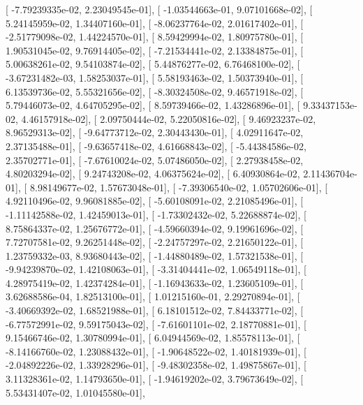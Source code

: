 \documentclass{article}
\begin{document}
       [ -7.79239335e-02,   2.23049545e-01],
       [ -1.03544663e-01,   9.07101668e-02],
       [  5.24145959e-02,   1.34407160e-01],
       [ -8.06237764e-02,   2.01617402e-01],
       [ -2.51779098e-02,   1.44224570e-01],
       [  8.59429994e-02,   1.80975780e-01],
       [  1.90531045e-02,   9.76914405e-02],
       [ -7.21534441e-02,   2.13384875e-01],
       [  5.00638261e-02,   9.54103874e-02],
       [  5.44876277e-02,   6.76468100e-02],
       [ -3.67231482e-03,   1.58253037e-01],
       [  5.58193463e-02,   1.50373940e-01],
       [  6.13539736e-02,   5.55321656e-02],
       [ -8.30324508e-02,   9.46571918e-02],
       [  5.79446073e-02,   4.64705295e-02],
       [  8.59739466e-02,   1.43286896e-01],
       [  9.33437153e-02,   4.46157918e-02],
       [  2.09750444e-02,   5.22050816e-02],
       [  9.46923237e-02,   8.96529313e-02],
       [ -9.64773712e-02,   2.30443430e-01],
       [  4.02911647e-02,   2.37135488e-01],
       [ -9.63657418e-02,   4.61668843e-02],
       [ -5.44384586e-02,   2.35702771e-01],
       [ -7.67610024e-02,   5.07486050e-02],
       [  2.27938458e-02,   4.80203294e-02],
       [  9.24743208e-02,   4.06375624e-02],
       [  6.40930864e-02,   2.11436704e-01],
       [  8.98149677e-02,   1.57673048e-01],
       [ -7.39306540e-02,   1.05702606e-01],
       [  4.92110496e-02,   9.96081885e-02],
       [ -5.60108091e-02,   2.21085496e-01],
       [ -1.11142588e-02,   1.42459013e-01],
       [ -1.73302432e-02,   5.22688874e-02],
       [  8.75864337e-02,   1.25676772e-01],
       [ -4.59660394e-02,   9.19961696e-02],
       [  7.72707581e-02,   9.26251448e-02],
       [ -2.24757297e-02,   2.21650122e-01],
       [  1.23759332e-03,   8.93680443e-02],
       [ -1.44880489e-02,   1.57321538e-01],
       [ -9.94239870e-02,   1.42108063e-01],
       [ -3.31404441e-02,   1.06549118e-01],
       [  4.28975419e-02,   1.42374284e-01],
       [ -1.16943633e-02,   1.23605109e-01],
       [  3.62688586e-04,   1.82513100e-01],
       [  1.01215160e-01,   2.29270894e-01],
       [ -3.40669392e-02,   1.68521988e-01],
       [  6.18101512e-02,   7.84433771e-02],
       [ -6.77572991e-02,   9.59175043e-02],
       [ -7.61601101e-02,   2.18770881e-01],
       [  9.15466746e-02,   1.30780994e-01],
       [  6.04944569e-02,   1.85578113e-01],
       [ -8.14166760e-02,   1.23088432e-01],
       [ -1.90648522e-02,   1.40181939e-01],
       [ -2.04892226e-02,   1.33928296e-01],
       [ -9.48302358e-02,   1.49875867e-01],
       [  3.11328361e-02,   1.14793650e-01],
       [ -1.94619202e-02,   3.79673649e-02],
       [  5.53431407e-02,   1.01045580e-01],
\end{document}
